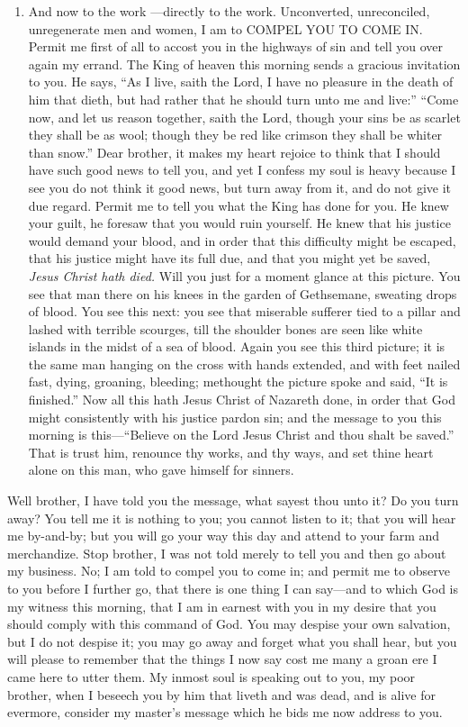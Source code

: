 \documentclass[
]{book}
\providecommand{\tightlist}{%
  \setlength{\itemsep}{0pt}\setlength{\parskip}{0pt}}
\begin{document}
\begin{enumerate}
\def\labelenumi{\Roman{enumi}.}
\setcounter{enumi}{1}
\tightlist
\item
  And now to the work ---directly to the work. Unconverted, unreconciled, unregenerate men and women, I am to COMPEL YOU TO COME IN. Permit me first of all to accost you in the highways of sin and tell you over again my errand. The King of heaven this morning sends a gracious invitation to you. He says, ``As I live, saith the Lord, I have no pleasure in the death of him that dieth, but had rather that he should turn unto me and live:'' ``Come now, and let us reason together, saith the Lord, though your sins be as scarlet they shall be as wool; though they be red like crimson they shall be whiter than snow.'' Dear brother, it makes my heart rejoice to think that I should have such good news to tell you, and yet I confess my soul is heavy because I see you do not think it good news, but turn away from it, and do not give it due regard. Permit me to tell you what the King has done for you. He knew your guilt, he foresaw that you would ruin yourself. He knew that his justice would demand your blood, and in order that this difficulty might be escaped, that his justice might have its full due, and that you might yet be saved, \emph{Jesus Christ hath died.} Will you just for a moment glance at this picture. You see that man there on his knees in the garden of Gethsemane, sweating drops of blood. You see this next: you see that miserable sufferer tied to a pillar and lashed with terrible scourges, till the shoulder bones are seen like white islands in the midst of a sea of blood. Again you see this third picture; it is the same man hanging on the cross with hands extended, and with feet nailed fast, dying, groaning, bleeding; methought the picture spoke and said, ``It is finished.'' Now all this hath Jesus Christ of Nazareth done, in order that God might consistently with his justice pardon sin; and the message to you this morning is this---``Believe on the Lord Jesus Christ and thou shalt be saved.'' That is trust him, renounce thy works, and thy ways, and set thine heart alone on this man, who gave himself for sinners.
\end{enumerate}

Well brother, I have told you the message, what sayest thou unto it? Do you turn away? You tell me it is nothing to you; you cannot listen to it; that you will hear me by-and-by; but you will go your way this day and attend to your farm and merchandize. Stop brother, I was not told merely to tell you and then go about my business. No; I am told to compel you to come in; and permit me to observe to you before I further go, that there is one thing I can say---and to which God is my witness this morning, that I am in earnest with you in my desire that you should comply with this command of God. You may despise your own salvation, but I do not despise it; you may go away and forget what you shall hear, but you will please to remember that the things I now say cost me many a groan ere I came here to utter them. My inmost soul is speaking out to you, my poor brother, when I beseech you by him that liveth and was dead, and is alive for evermore, consider my master's message which he bids me now address to you.
\end{document}
